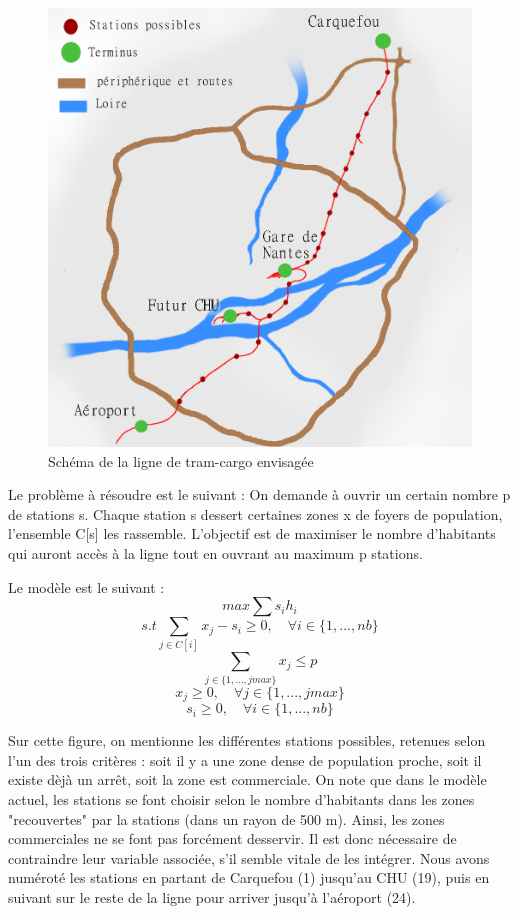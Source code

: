 \documentclass[a4paper,10pt]{article}
\begin{document}
\begin{figure}[!h]
  \centering
  \includegraphics[scale = 0.3]{tramcargo4.png}
  \caption{Schéma de la ligne de tram-cargo envisagée}
\end{figure}

\newpage
Le problème à résoudre est le suivant : On demande à ouvrir un certain nombre p de stations s. Chaque station s dessert certaines zones x de foyers de population, l'ensemble C[s] les rassemble. L'objectif est de maximiser le nombre d'habitants qui auront accès à la ligne tout en ouvrant au maximum p stations.  
 
Le modèle est le suivant :
$$ max \sum s_i h_i$$
$$s.t \sum_{j\in C[i]} x_j -s_i \geq 0,\quad  \forall i \in \{1,...,nb\}$$
$$ \sum_{j\in \{1,...,jmax\} } x_j \leq p $$
$$ x_j \geq 0, \quad \forall j \in \{1,...,jmax\}$$
$$ s_i \geq 0, \quad \forall i \in \{1,...,nb\}$$


Sur cette figure, on mentionne les différentes stations possibles, retenues selon l'un des trois critères : soit il y a une zone dense de population proche, soit il existe dèjà un arrêt, soit la zone est commerciale. On note que dans le modèle actuel, les stations se font choisir selon le nombre d'habitants dans les zones "recouvertes" par la stations (dans un rayon de 500 m). Ainsi, les zones commerciales ne se font pas forcément desservir. Il est donc nécessaire de contraindre leur variable associée, s'il semble vitale de les intégrer. Nous avons numéroté les stations en partant de Carquefou (1) jusqu'au CHU (19), puis en suivant sur le reste de la ligne pour arriver jusqu'à l'aéroport (24).
\end{document}
